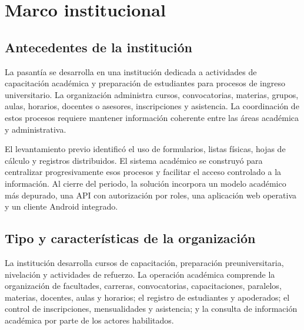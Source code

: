 \documentclass[12pt,a4paper,oneside]{report}
\begin{document}
\newpage

\renewcommand{\contentsname}{Índice general}
\tableofcontents

\newpage
{}
\setcounter{page}{1}

\chapter{Marco institucional}

\section{Antecedentes de la institución}

La pasantía se desarrolla en una institución dedicada a actividades de capacitación académica y preparación de estudiantes para procesos de ingreso universitario. La organización administra cursos, convocatorias, materias, grupos, aulas, horarios, docentes o asesores, inscripciones y asistencia. La coordinación de estos procesos requiere mantener información coherente entre las áreas académica y administrativa.

El levantamiento previo identificó el uso de formularios, listas físicas, hojas de cálculo y registros distribuidos. El sistema académico se construyó para centralizar progresivamente esos procesos y facilitar el acceso controlado a la información. Al cierre del periodo, la solución incorpora un modelo académico más depurado, una API con autorización por roles, una aplicación web operativa y un cliente Android integrado.

\section{Tipo y características de la organización}

La institución desarrolla cursos de capacitación, preparación preuniversitaria, nivelación y actividades de refuerzo. La operación académica comprende la organización de facultades, carreras, convocatorias, capacitaciones, paralelos, materias, docentes, aulas y horarios; el registro de estudiantes y apoderados; el control de inscripciones, mensualidades y asistencia; y la consulta de información académica por parte de los actores habilitados.
\end{document}
